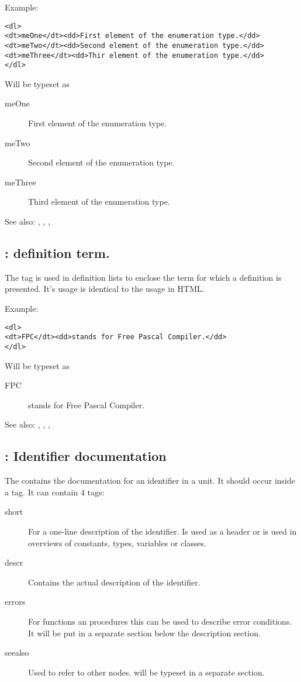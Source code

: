 Example:
\begin{verbatim}
<dl>
<dt>meOne</dt><dd>First element of the enumeration type.</dd>
<dt>meTwo</dt><dd>Second element of the enumeration type.</dd>
<dt>meThree</dt><dd>Thir element of the enumeration type.</dd>
</dl>
\end{verbatim}
Will be typeset as
\begin{description}
\item[meOne] First element of the enumeration type.
\item[meTwo] Second element of the enumeration type.
\item[meThree] Third element of the enumeration type.
\end{description}

See also: , , , 

\subsection{ : definition term.}
\label{tag:dt}
The  tag is used in definition lists to enclose the term for which a
definition is presented. It's usage is identical to the usage in HTML.

Example:
\begin{verbatim}
<dl>
<dt>FPC</dt><dd>stands for Free Pascal Compiler.</dd>
</dl>
\end{verbatim}
Will be typeset as
\begin{description}
\item[FPC] stands for Free Pascal Compiler.
\end{description}

See also: , , , 


\subsection{ : Identifier documentation}
\label{tag:element}
The  contains the documentation for an identifier in a unit. It
should occur inside a  tag. It can contain 4 tags:
\begin{description}
\item[short] For a one-line description of the identifier. Is used as a
header or is used in overviews of constants, types, variables or classes.
\item[descr] Contains the actual description of the identifier.
\item[errors] For functions an procedures this can be used to describe error
conditions. It will be put in a separate section below the description
section.
\item[seealso] Used to refer to other nodes. will be typeset in a separate
section.
\end{description}

